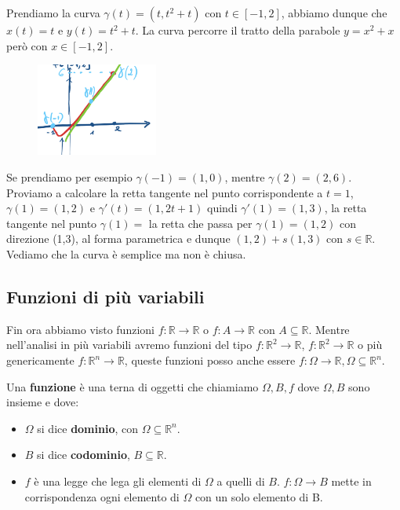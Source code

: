 \begin{example}
Prendiamo la curva $\gamma(t) = (t, t^2+t)$ con $t \in [-1,2]$, abbiamo dunque che $x(t) = t$ e $y(t) = t^2 + t$. La curva percorre il tratto della parabole $y= x^2 + x$ però con $x \in [-1,2]$.
\end{example}
\begin{figure}
    \vspace{-15pt}
    \centering
    \includegraphics[width=4cm]{images/ess-curva-piano-2.png}
\end{figure}
Se prendiamo per esempio $\gamma(-1) = (1, 0)$, mentre $\gamma(2) = (2,6)$.\\
Proviamo a calcolare la retta tangente nel punto corrispondente a $t=1$, $\gamma(1) = (1,2)$ e $\gamma'(t) = (1, 2t+1)$ quindi $\gamma'(1) = (1,3)$, la retta tangente nel punto $\gamma(1) =$ la retta che passa per $\gamma(1) = (1,2)$ con direzione (1,3), al forma parametrica e dunque $(1,2) + s(1,3)$ con $s \in \mathbb{R}$. Vediamo che la curva è semplice ma non è chiusa.

\subsection{Funzioni di più variabili}
Fin ora abbiamo visto funzioni $f: \mathbb{R} \to \mathbb{R}$ o $f: A \to \mathbb{R}$ con $A \subseteq \mathbb{R}$. Mentre nell'analisi in più variabili avremo funzioni del tipo $f: \mathbb{R}^2 \to \mathbb{R}$, $f: \mathbb{R}^2 \to \mathbb{R}$ o più genericamente $f: \mathbb{R}^n \to \mathbb{R}$, queste funzioni posso anche essere $f: \Omega \to \mathbb{R}, \Omega \subseteq \mathbb{R}^n$.

\begin{definition}
Una \textbf{funzione} è una terna di oggetti che chiamiamo $\Omega, B, f$ dove $\Omega, B$ sono insieme e dove:
\begin{itemize}
    \item $\Omega$ si dice \textbf{dominio}, con $\Omega \subseteq \mathbb{R}^n$.
    \item $B$ si dice \textbf{codominio}, $B \subseteq \mathbb{R}$.
    \item $f$ è una legge che lega gli elementi di $\Omega$ a quelli di $B$. $f: \Omega\to B$ mette in corrispondenza ogni elemento di $\Omega$ con un solo elemento di B.
\end{itemize}
\end{definition}

